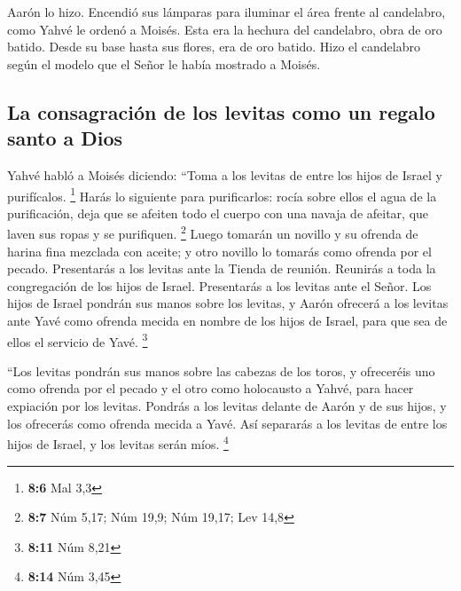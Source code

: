  Aarón lo hizo. Encendió sus lámparas para iluminar el
área frente al candelabro, como Yahvé le ordenó a Moisés. 
Esta era la hechura del candelabro, obra de oro batido. Desde su base
hasta sus flores, era de oro batido. Hizo el candelabro según el modelo
que el Señor le había mostrado a Moisés.

\hypertarget{la-consagraciuxf3n-de-los-levitas-como-un-regalo-santo-a-dios}{%
\subsection{La consagración de los levitas como un regalo santo a
Dios}\label{la-consagraciuxf3n-de-los-levitas-como-un-regalo-santo-a-dios}}

 Yahvé habló a Moisés diciendo:  ``Toma a
los levitas de entre los hijos de Israel y purifícalos. \footnote{\textbf{8:6}
  Mal 3,3}  Harás lo siguiente para purificarlos: rocía
sobre ellos el agua de la purificación, deja que se afeiten todo el
cuerpo con una navaja de afeitar, que laven sus ropas y se purifiquen.
\footnote{\textbf{8:7} Núm 5,17; Núm 19,9; Núm 19,17; Lev 14,8}
 Luego tomarán un novillo y su ofrenda de harina fina
mezclada con aceite; y otro novillo lo tomarás como ofrenda por el
pecado.  Presentarás a los levitas ante la Tienda de
reunión. Reunirás a toda la congregación de los hijos de Israel.
 Presentarás a los levitas ante el Señor. Los hijos de
Israel pondrán sus manos sobre los levitas,  y Aarón
ofrecerá a los levitas ante Yavé como ofrenda mecida en nombre de los
hijos de Israel, para que sea de ellos el servicio de Yavé. \footnote{\textbf{8:11}
  Núm 8,21}

 ``Los levitas pondrán sus manos sobre las cabezas de los
toros, y ofreceréis uno como ofrenda por el pecado y el otro como
holocausto a Yahvé, para hacer expiación por los levitas.
 Pondrás a los levitas delante de Aarón y de sus hijos, y
los ofrecerás como ofrenda mecida a Yavé.  Así separarás
a los levitas de entre los hijos de Israel, y los levitas serán míos.
\footnote{\textbf{8:14} Núm 3,45}

